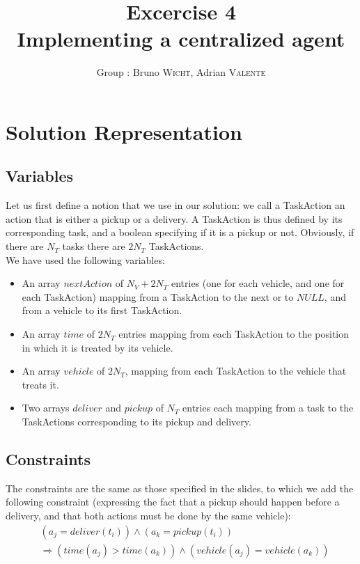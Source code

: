 \documentclass[11pt]{article}
\title{\bf Excercise 4\\ Implementing a centralized agent}
\author{Group \textnumero 4: Bruno \textsc{Wicht}, Adrian \textsc{Valente}}
\begin{document}
\maketitle

\section{Solution Representation}

\subsection{Variables}
Let us first define a notion that we use in our solution: we call a TaskAction an action that is either a pickup or a delivery. A TaskAction is thus defined by its corresponding task, and a boolean specifying if it is a pickup or not. Obviously, if there are $N_T$ tasks there are $2N_T$ TaskActions.\\
We have used the following variables:
\begin{itemize}
\item An array $nextAction$ of $N_V+2N_T$ entries (one for each vehicle, and one for each TaskAction) mapping from a TaskAction to the next or to $NULL$, and from a vehicle to its first TaskAction.
\item An array $time$ of $2N_T$ entries mapping from each TaskAction to the position in which it is treated by its vehicle.
\item An array $vehicle$ of $2N_T$, mapping from each TaskAction to the vehicle that treats it.
\item Two arrays $deliver$ and $pickup$ of $N_T$ entries each mapping from a task to the TaskActions corresponding to its pickup and delivery.
\end{itemize}

\subsection{Constraints}
The constraints are the same as those specified in the slides, to which we add the following constraint (expressing the fact that a pickup should happen before a delivery, and that both actions must be done by the same vehicle):
\begin{equation}\label{constraint}
\begin{split}
& (a_j = deliver(t_i)) \land (a_k = pickup(t_i)) \\
& \Rightarrow (time(a_j) > time(a_k)) \land (vehicle(a_j) = vehicle(a_k))
\end{split}
\end{equation}
\end{document}

